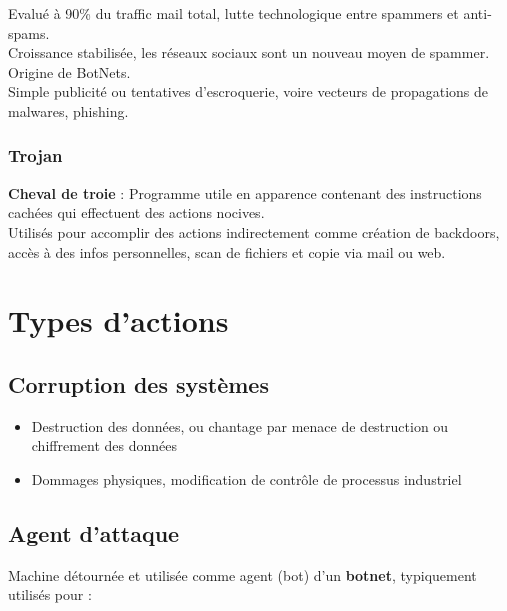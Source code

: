 \documentclass{report}
\begin{document}
				Evalué à 90\% du traffic mail total, lutte technologique entre spammers et anti-spams.\\

				Croissance stabilisée, les réseaux sociaux sont un nouveau moyen de spammer.\\

				Origine de BotNets.\\

				Simple publicité ou tentatives d'escroquerie, voire vecteurs de propagations de malwares, phishing.\\

			\subsubsection{Trojan}

				\textbf{Cheval de troie} : Programme utile en apparence contenant des instructions cachées qui effectuent des actions nocives.\\

				Utilisés pour accomplir des actions indirectement comme création de backdoors, accès à des infos personnelles, scan de fichiers et copie via mail ou web.\\

	\section{Types d'actions}

		\subsection{Corruption des systèmes}

			\begin{itemize}
				\item Destruction des données, ou chantage par menace de destruction ou chiffrement des données
				\item Dommages physiques, modification de contrôle de processus industriel\\
			\end{itemize}

		\subsection{Agent d'attaque}

			Machine détournée et utilisée comme agent (bot) d'un \textbf{botnet}, typiquement utilisés pour : \\
\end{document}
